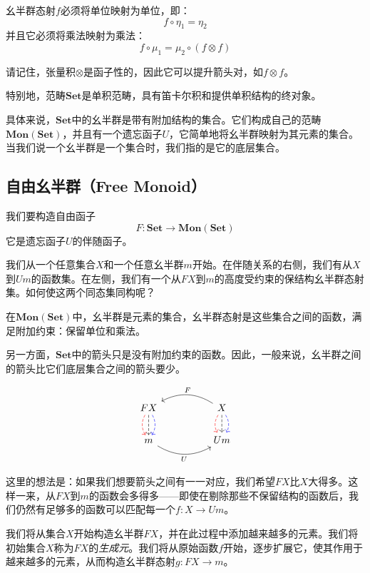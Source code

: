 \documentclass[DaoFP]{subfiles}
\begin{document}
    幺半群态射$f$必须将单位映射为单位，即：
    \[ f \circ \eta_1 = \eta_2 \]
    并且它必须将乘法映射为乘法：
    \[ f \circ \mu_1 = \mu_2 \circ (f \otimes f)\]

    请记住，张量积$\otimes$是函子性的，因此它可以提升箭头对，如$f \otimes f$。

    特别地，范畴$\mathbf{Set}$是单积范畴，具有笛卡尔积和提供单积结构的终对象。

    具体来说，$\mathbf{Set}$中的幺半群是带有附加结构的集合。它们构成自己的范畴$\mathbf{Mon}(\mathbf{Set})$，并且有一个遗忘函子$U$，它简单地将幺半群映射为其元素的集合。当我们说一个幺半群是一个集合时，我们指的是它的底层集合。

    \subsection{自由幺半群（Free Monoid）}

    我们要构造自由函子
    \[ F \colon \mathbf{Set} \to \mathbf{Mon}(\mathbf{Set})\]
    它是遗忘函子$U$的伴随函子。

    我们从一个任意集合$X$和一个任意幺半群$m$开始。在伴随关系的右侧，我们有从$X$到$U m$的函数集。在左侧，我们有一个从$F X$到$m$的高度受约束的保结构幺半群态射集。如何使这两个同态集同构呢？

    在$\mathbf{Mon}(\mathbf{Set})$中，幺半群是元素的集合，幺半群态射是这些集合之间的函数，满足附加约束：保留单位和乘法。

    另一方面，$\mathbf{Set}$中的箭头只是没有附加约束的函数。因此，一般来说，幺半群之间的箭头比它们底层集合之间的箭头要少。

    \[
        \begin{tikzcd}
            F X
            \arrow[d, bend right, red, dashed]
            \arrow[d, dashed]
            \arrow[d, bend left, blue, dashed]
            &&
            X
            \arrow[d, bend right, red, dashed]
            \arrow[d, dashed]
            \arrow[d, bend left, blue, dashed]
            \arrow[ll, bend right, "F"']
            \\
            m
            \arrow[rr, bend right, "U"']
            &&
            U m
        \end{tikzcd}
    \]

    这里的想法是：如果我们想要箭头之间有一一对应，我们希望$F X$比$X$大得多。这样一来，从$F X$到$m$的函数会多得多——即使在剔除那些不保留结构的函数后，我们仍然有足够多的函数可以匹配每一个$f \colon X \to U m$。

    我们将从集合$X$开始构造幺半群$F X$，并在此过程中添加越来越多的元素。我们将初始集合$X$称为$F X$的\emph{生成元}。我们将从原始函数$f$开始，逐步扩展它，使其作用于越来越多的元素，从而构造幺半群态射$g \colon F X \to m$。
\end{document}
